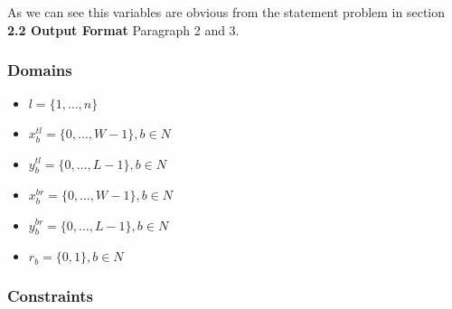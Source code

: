 \documentclass[12pt, a4paper]{article}
\begin{document}
As we can see this variables are obvious from the statement problem in section \textbf{2.2 Output Format} Paragraph 2 and 3.

\subsubsection{Domains}
\begin{itemize}
  \item $l = \{1,\dots,n\}$
  \item $x_b^{tl} = \{0,\dots,W-1\}, b \in N$
  \item $y_b^{tl} = \{0,\dots,L-1\}, b \in N$
  \item $x_b^{br} = \{0,\dots,W-1\}, b \in N$
  \item $y_b^{br} = \{0,\dots,L-1\}, b \in N$
  \item $r_b = \{0,1\}, b \in N$
\end{itemize}


\subsubsection{Constraints}
\end{document}

